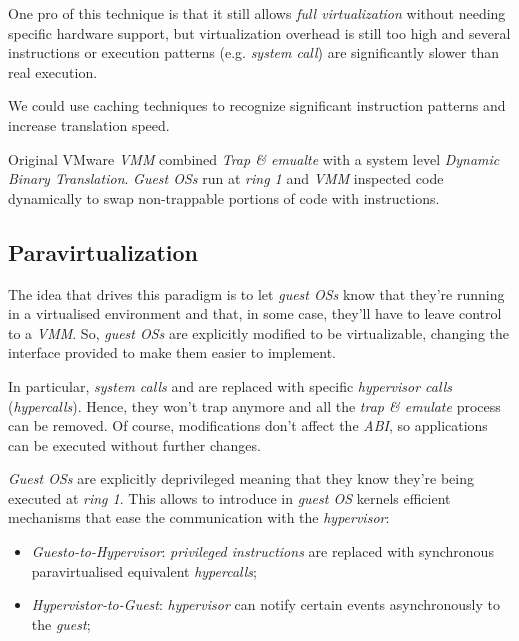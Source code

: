 One pro of this technique is that it still allows \emph{full virtualization}
without needing specific hardware support, but virtualization overhead is still
too high and several instructions or execution patterns (e.g. \emph{system call})
are significantly slower than real execution.

\begin{note}
    We could use caching techniques to recognize significant instruction patterns
    and increase translation speed.
\end{note}
\begin{note}
    Original VMware \emph{VMM} combined \emph{Trap \& emualte} with a system
    level \emph{Dynamic Binary Translation}. \emph{Guest OSs} run at \emph{ring 1}
    and \emph{VMM} inspected code dynamically to swap non-trappable portions of
    code with  instructions.
\end{note}

\subsection{Paravirtualization}
The idea that drives this paradigm is to let \emph{guest OSs} know that
they're running in a virtualised environment  and that, in some case, they'll
have to leave control to a \emph{VMM}. So, \emph{guest OSs} are explicitly
modified to be virtualizable, changing the interface provided to make them
easier to implement.

In particular, \emph{system calls} and  are
replaced with specific \emph{hypervisor calls} (\emph{hypercalls}). Hence,
they won't trap anymore and all the \emph{trap \& emulate} process can be
removed. Of course, modifications don't affect the \emph{ABI}, so applications
can be executed without further changes.

\emph{Guest OSs} are explicitly deprivileged meaning that they know they're being
executed at \emph{ring 1}. This allows to introduce in \emph{guest OS}
kernels efficient mechanisms that ease the communication with the
\emph{hypervisor}:
\begin{itemize}
    \item\emph{Guesto-to-Hypervisor}: \emph{privileged instructions} are replaced
    with synchronous paravirtualised equivalent \emph{hypercalls};
    \item\emph{Hypervistor-to-Guest}: \emph{hypervisor} can notify certain events
    asynchronously to the \emph{guest};
\end{itemize}

